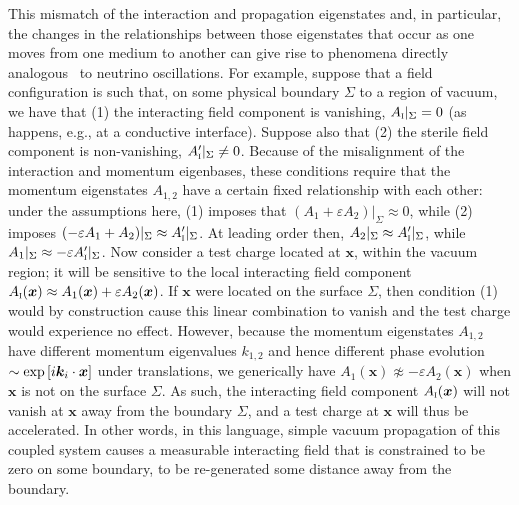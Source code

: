 \documentclass[amsmath,amssymb,aps,10pt,prd,letterpaper,nofootinbib,balancelastpage,notitlepage,superscriptaddress,twocolumn,floatfix]{revtex4-2}
\newcommand{\lb}{\ensuremath{\left}}					%
\newcommand{\rb}{\ensuremath{\right}}					%
\newcommand{\tsc}[1]{\textsc{#1}}
\begin{document}
This mismatch of the interaction and propagation eigenstates and, in particular, the changes in the relationships between those eigenstates that occur as one moves from one medium to another can give rise to phenomena directly analogous~\cite{Graham:2014sha} to neutrino oscillations.
For example, suppose that a field configuration is such that, on some physical boundary $\Sigma$ to a region of vacuum, we have that (1) the interacting field component is vanishing, $A_{\tsc{i}}|_{\Sigma} =0$ (as happens, e.g., at a conductive interface).
Suppose also that (2) the sterile field component is non-vanishing, $A'_{\tsc{i}}|_{\Sigma}\neq0$.
Because of the misalignment of the interaction and momentum eigenbases, these conditions require that the momentum eigenstates $A_{1,2}$ have a certain fixed relationship with each other: under the assumptions here, (1) imposes that $(A_1 + \varepsilon A_2)|_{\Sigma} \approx 0$, while (2) imposes $(-\varepsilon A_1 + A_2)|_{\Sigma} \approx A'_{\tsc{i}}|_{\Sigma}$.
At leading order then, $A_2|_{\Sigma} \approx A'_{\tsc{i}}|_{\Sigma}$, while $A_1|_{\Sigma} \approx -\varepsilon A'_{\tsc{i}}|_{\Sigma}$.
Now consider a test charge located at $\bm{x}$, within the vacuum region; it will be sensitive to the local interacting field component $A_{\tsc{i}}(\bm{x}) \approx A_1(\bm{x}) + \varepsilon A_2(\bm{x})$.
If $\bm{x}$ were located on the surface $\Sigma$, then condition (1) would by construction cause this linear combination to vanish and the test charge would experience no effect.
However, because the momentum eigenstates $A_{1,2}$ have different momentum eigenvalues $k_{1,2}$ and hence different phase evolution $\sim \exp\lb[ i\bm{k}_i\cdot \bm{x} \rb]$ under translations, we generically have $A_1(\bm{x}) \not\approx -\varepsilon A_2(\bm{x})$ when $\bm{x}$ is not on the surface $\Sigma$.
As such, the interacting field component $A_{\tsc{i}}(\bm{x})$ will not vanish at $\bm{x}$ away from the boundary $\Sigma$, and a test charge at $\bm{x}$ will thus be accelerated.
In other words, in this language, simple vacuum propagation of this coupled system causes a measurable interacting field that is constrained to be zero on some boundary, to be re-generated some distance away from the boundary.
\end{document}
